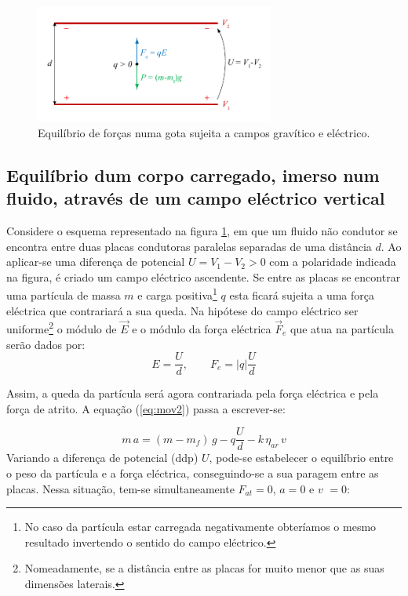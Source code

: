 \documentclass[a4paper,twoside,11pt]{report}      %
\begin{document}
%


\begin{figure}
	[tb]  \centering 
	\includegraphics[width=0.7\textwidth]{./F_equil}
	\caption{Equilíbrio de forças numa gota sujeita a campos gravítico e eléctrico. \label{fig:f_equil}} 
\end{figure}


\subsection{\sf Equilíbrio dum corpo carregado, imerso num fluido, através de um campo eléctrico vertical}

Considere o esquema representado na figura \ref{fig:f_equil}, em que um fluido não condutor se encontra entre duas placas condutoras paralelas separadas de uma distância $d$. Ao aplicar-se uma diferença de potencial \mbox{$U = V_1 -V_2 > 0$} com a polaridade indicada na figura, é criado um campo eléctrico ascendente. Se entre as placas se encontrar uma partícula de massa $m$ e carga positiva\footnote{No caso da partícula estar carregada negativamente obteríamos o mesmo resultado invertendo o sentido do campo eléctrico.} $q$  esta ficará sujeita a uma força eléctrica que contrariará a sua queda.
Na hipótese do campo eléctrico ser uniforme\footnote{Nomeadamente, se a distância entre as placas for muito menor que as suas dimensões laterais.} o módulo de $\vec{E}$ e o módulo da força eléctrica $\vec{F}_e$ que atua na partícula serão dados por:
\begin{equation*}
	E = \frac{U}{d}, \qquad  F_e = |q| \frac{U}{d}
\end{equation*}

Assim, a queda da partícula será agora contrariada pela força eléctrica e pela força de atrito.
A equação (\ref{eq:mov2}) passa a escrever-se:

\begin{equation}
	\label{eq:mov3}
	m\,a = (m - m_f)\,g  - q \frac{U}{d} - k  \, \eta_{ar} \, v
\end{equation}
Variando a diferença de potencial (ddp) $U$, pode-se estabelecer o equilíbrio entre o peso da partícula e a força eléctrica, conseguindo-se a sua paragem entre as placas. Nessa situação, tem-se simultaneamente $F_{at}=0$, $a=0$ e  $v$  $=0$:
\end{document}
